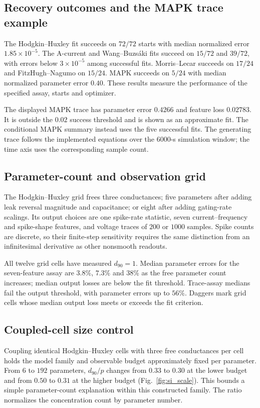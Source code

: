 \documentclass[11pt,letterpaper]{article}
\begin{document}
\subsection{Recovery outcomes and the MAPK trace example}
The Hodgkin--Huxley fit succeeds on $72/72$ starts with median normalized error $1.85\times10^{-5}$. The A-current and Wang--Buzs\'aki fits succeed on $15/72$ and $39/72$, with errors below $3\times10^{-5}$ among successful fits. Morris--Lecar succeeds on $17/24$ and FitzHugh--Nagumo on $15/24$. MAPK succeeds on $5/24$ with median normalized parameter error $0.40$. These results measure the performance of the specified assay, starts and optimizer.

The displayed MAPK trace has parameter error $0.4266$ and feature loss $0.02783$. It is outside the $0.02$ success threshold and is shown as an approximate fit. The conditional MAPK summary instead uses the five successful fits. The generating trace follows the implemented equations over the $6000$-s simulation window; the time axis uses the corresponding sample count.

\subsection{Parameter-count and observation grid}
The Hodgkin--Huxley grid frees three conductances; five parameters after adding leak reversal magnitude and capacitance; or eight after adding gating-rate scalings. Its output choices are one spike-rate statistic, seven current--frequency and spike-shape features, and voltage traces of $200$ or $1000$ samples. Spike counts are discrete, so their finite-step sensitivity requires the same distinction from an infinitesimal derivative as other nonsmooth readouts.

All twelve grid cells have measured $d_{90}=1$. Median parameter errors for the seven-feature assay are $3.8\%$, $7.3\%$ and $38\%$ as the free parameter count increases; median output losses are below the fit threshold. Trace-assay medians fail the output threshold, with parameter errors up to $56\%$. Daggers mark grid cells whose median output loss meets or exceeds the fit criterion.

\subsection{Coupled-cell size control}
Coupling identical Hodgkin--Huxley cells with three free conductances per cell holds the model family and observable budget approximately fixed per parameter. From $6$ to $192$ parameters, $d_{90}/p$ changes from $0.33$ to $0.30$ at the lower budget and from $0.50$ to $0.31$ at the higher budget (Fig.~\ref{fig:si_scale}). This bounds a simple parameter-count explanation within this constructed family. The ratio normalizes the concentration count by parameter number.
\end{document}
